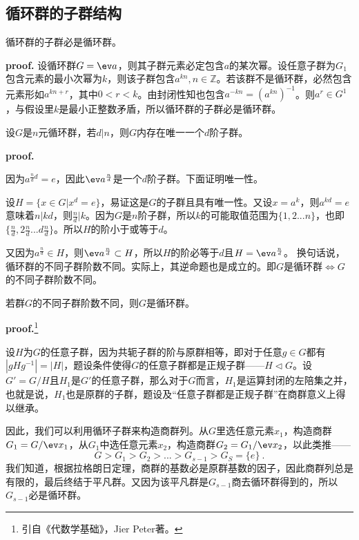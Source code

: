 \subsection{循环群的子群结构}
\begin{theorem}{}\label{the_cyclic_1}
循环群的子群必是循环群。
\end{theorem}
\textbf{proof.}
设循环群$G=\ev a$，则其子群元素必定包含$a$的某次幂。设任意子群为$G_1$包含元素的最小次幂为$k$，则该子群包含$a^{kn},n\in \mathbb Z$。若该群不是循环群，必然包含元素形如$a^{kn+r}$，其中$0< r<k$。由封闭性知也包含$a^{-kn}=(a^{kn})^{-1}$。则$a^{r}\in G^{1}$，与假设里$k$是最小正整数矛盾，所以循环群的子群必是循环群。
\begin{theorem}{}
设$G$是$n$元循环群，若$d|n$，则$G$内存在唯一一个$d$阶子群。
\end{theorem}
\textbf{proof.}

因为$a^{\frac{n}{d}d}=e$，因此$\ev a^{\frac{n}{d}}$是一个$d$阶子群。下面证明唯一性。

设$H=\{x\in G|x^d=e\}$，易证这是$G$的子群且具有唯一性。又设$x=a^k$，则$a^{kd}=e$意味着$n|kd$，则$\frac{n}{d}|k$。因为$G$是$n$阶子群，所以$k$的可能取值范围为$\{1,2...n\}$，也即$\{\frac{n}{d},2\frac{n}{d}...d\frac{n}{d}\}$。所以$H$的阶小于或等于$d$。

又因为$a^{\frac{n}{d}}\in H$，则$\ev a^{\frac{n}{d}}\subset H$，所以$H$的阶必等于$d$且$H=\ev a^{\frac{n}{d}}$。
换句话说，循环群的不同子群阶数不同。实际上，其逆命题也是成立的。即$G$是循环群$\Longleftrightarrow G$的不同子群阶数不同。
\begin{theorem}{}\label{the_cyclic_2}
若群$G$的不同子群阶数不同，则$G$是循环群。
\end{theorem}
\textbf{proof.}\footnote{引自《代数学基础》，Jier Peter著。}

设$H$为$G$的任意子群，因为共轭子群的阶与原群相等，即对于任意$g\in G$都有$|gHg^{-1}|=|H|$，题设条件使得$G$的任意子群都是正规子群——$H\lhd G$。设$G'=G/H$且$H_1$是$G'$的任意子群，那么对于$G$而言，$H_1$是运算封闭的左陪集之并，也就是说，$H_1$也是原群的子群，题设及“任意子群都是正规子群”在商群意义上得以继承。

因此，我们可以利用循环子群来构造商群列。从$G$里选任意元素$x_1$，构造商群$G_1=G/\ev x_1$，从$G_1$中选任意元素$x_2$，构造商群$G_2=G_1/\ev x_2$，以此类推——
\begin{equation}
G>G_1>G_2>...>G_{s-1}>G_S=\{e\}~.
\end{equation}
我们知道，根据拉格朗日定理，商群的基数必是原群基数的因子，因此商群列总是有限的，最后终结于平凡群。又因为该平凡群是$G_{s-1}$商去循环群得到的，所以$G_{s-1}$必是循环群。

